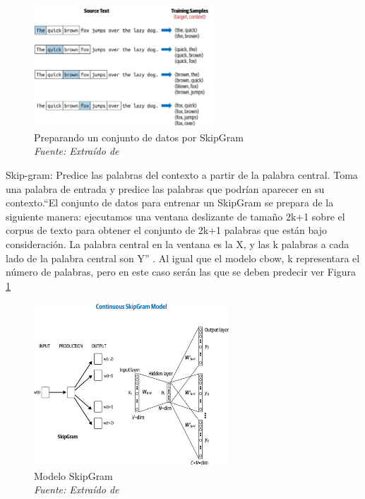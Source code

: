 \begin{itemize}
\begin{itemize}
\begin{figure}[h!]
	\includegraphics[width=0.6\textwidth]{capitulo3/figuras/nlp5.png}
	\caption{Preparando un conjunto de datos por SkipGram
		\\\textit{Fuente: Extraído de} \protect\cite[p. 101]{vajjala2020practical}}
	\label{fig:nlp5}
\end{figure}

Skip-gram: Predice las palabras del contexto a partir de la palabra central. Toma una palabra de entrada y predice las palabras que podrían aparecer en su contexto.``El conjunto de datos para entrenar un SkipGram se prepara de la siguiente manera: ejecutamos una ventana deslizante de tamaño 2k+1 sobre el corpus de texto para obtener el conjunto de 2k+1 palabras que están bajo consideración. La palabra central en la ventana es la X, y las k palabras a cada lado de la palabra central son Y'' \cite[p. 101]{vajjala2020practical}. Al igual que el modelo cbow, k representara el número de palabras, pero en este caso serán las que se deben predecir ver Figura \ref{fig:nlp5}



\begin{figure}[h!]
	\includegraphics[width=0.65\textwidth]{capitulo3/figuras/nlp6.png}
	\caption{Modelo SkipGram
		\\\textit{Fuente: Extraído de} \protect\cite[p. 102]{vajjala2020practical}}
	\label{fig:nlp6}
\end{figure}


\end{itemize}
\end{itemize}
